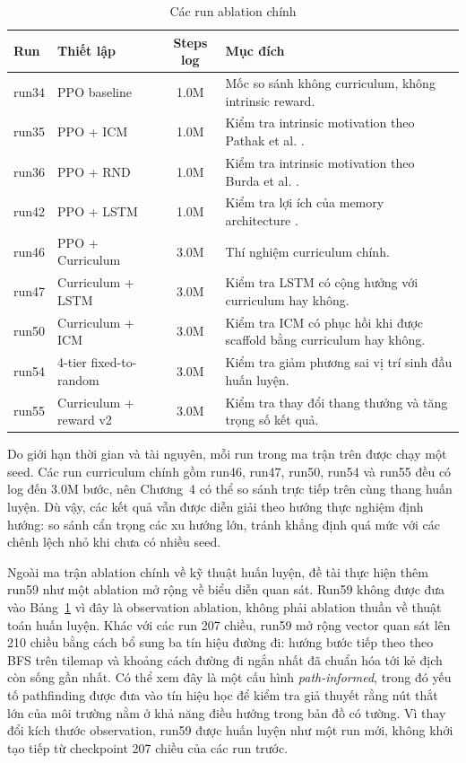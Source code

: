 \begin{table}[H]
    \centering
    \small
    \caption{Các run ablation chính}
    \label{tab:ablation_matrix_design}
    \begin{tabular}{|p{2cm}|p{5.1cm}|c|p{5.2cm}|}
        \hline
        \textbf{Run} & \textbf{Thiết lập} & \textbf{Steps log} & \textbf{Mục đích} \\
        \hline
        run34 & PPO baseline & 1.0M & Mốc so sánh không curriculum, không intrinsic reward. \\
        \hline
        run35 & PPO + ICM & 1.0M & Kiểm tra intrinsic motivation theo Pathak et al. \cite{Pathak2017}. \\
        \hline
        run36 & PPO + RND & 1.0M & Kiểm tra intrinsic motivation theo Burda et al. \cite{Burda2018}. \\
        \hline
        run42 & PPO + LSTM & 1.0M & Kiểm tra lợi ích của memory architecture \cite{Hochreiter1997}. \\
        \hline
        run46 & PPO + Curriculum & 3.0M & Thí nghiệm curriculum chính. \\
        \hline
        run47 & Curriculum + LSTM & 3.0M & Kiểm tra LSTM có cộng hưởng với curriculum hay không. \\
        \hline
        run50 & Curriculum + ICM & 3.0M & Kiểm tra ICM có phục hồi khi được scaffold bằng curriculum hay không. \\
        \hline
        run54 & 4-tier fixed-to-random & 3.0M & Kiểm tra giảm phương sai vị trí sinh đầu huấn luyện. \\
        \hline
        run55 & Curriculum + reward v2 & 3.0M & Kiểm tra thay đổi thang thưởng và tăng trọng số kết quả. \\
        \hline
    \end{tabular}
\end{table}

Do giới hạn thời gian và tài nguyên, mỗi run trong ma trận trên được chạy một seed. Các run curriculum chính gồm run46, run47, run50, run54 và run55 đều có log đến 3.0M bước, nên Chương~4 có thể so sánh trực tiếp trên cùng thang huấn luyện. Dù vậy, các kết quả vẫn được diễn giải theo hướng thực nghiệm định hướng: so sánh cẩn trọng các xu hướng lớn, tránh khẳng định quá mức với các chênh lệch nhỏ khi chưa có nhiều seed.

Ngoài ma trận ablation chính về kỹ thuật huấn luyện, đề tài thực hiện thêm run59 như một ablation mở rộng về biểu diễn quan sát. Run59 không được đưa vào Bảng~\ref{tab:ablation_matrix_design} vì đây là observation ablation, không phải ablation thuần về thuật toán huấn luyện. Khác với các run 207 chiều, run59 mở rộng vector quan sát lên 210 chiều bằng cách bổ sung ba tín hiệu đường đi: hướng bước tiếp theo theo BFS trên tilemap và khoảng cách đường đi ngắn nhất đã chuẩn hóa tới kẻ địch còn sống gần nhất. Có thể xem đây là một cấu hình \emph{path-informed}, trong đó yếu tố pathfinding được đưa vào tín hiệu học để kiểm tra giả thuyết rằng nút thắt lớn của môi trường nằm ở khả năng điều hướng trong bản đồ có tường. Vì thay đổi kích thước observation, run59 được huấn luyện như một run mới, không khởi tạo tiếp từ checkpoint 207 chiều của các run trước.


